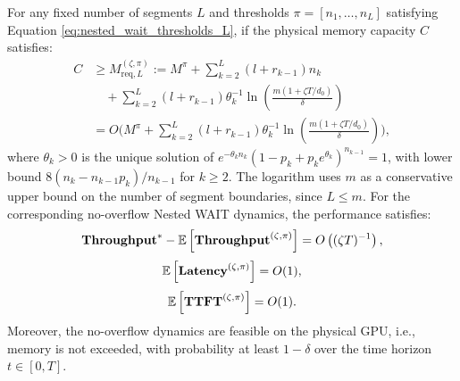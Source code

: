 \begin{theorem}
\label{thm:nested_wait_heavy_traffic, any segment}
For any fixed number of segments $L$ and thresholds $\pi = [n_1, \dots, n_L]$ satisfying Equation \eqref{eq:nested_wait_thresholds_L}, if the physical memory capacity \(C\) satisfies:
\begin{equation}
    \label{eq:nested_wait_memory_L}
    \begin{aligned}
	C &\ge M_{\mathrm{req},L}^{(\zeta,\pi)}
	:= M^\pi
		+ \sum_{k=2}^L (l + r_{k-1}) n_k \\
	&\quad
	+ \sum_{k=2}^L (l + r_{k-1}) \theta_k^{-1}
\ln\left( \frac{m(1+\zeta T/d_0)}{\delta} \right) \\
&= O\biggl( M^\pi
+ \sum_{k=2}^L (l + r_{k-1}) \theta_k^{-1}
\ln\left( \frac{m(1+\zeta T/d_0)}{\delta} \right) \biggr),
    \end{aligned}
\end{equation}
where $\theta_k>0$ is the unique solution of \(e^{-\theta_k n_k}(1-p_k+p_ke^{\theta_k})^{n_{k-1}}=1\), with lower bound $8(n_k-n_{k-1}p_k)/n_{k-1}$ for \(k\ge2\). The logarithm uses \(m\) as a conservative upper bound on the number of segment boundaries, since \(L\le m\).
For the corresponding no-overflow Nested WAIT dynamics, the performance satisfies:
$$\textbf{Throughput}^* - \mathbb{E}\left[ \textbf{Throughput}^{(\zeta, \pi)} \right] = O\left( (\zeta T)^{-1} \right),$$
$$\mathbb{E}\left[ \textbf{Latency}^{(\zeta, \pi)} \right] = O(1),$$
$$\mathbb{E}\left[ \textbf{TTFT}^{(\zeta, \pi)} \right] = O(1).$$
Moreover, the no-overflow dynamics are feasible on the physical GPU, i.e., memory is not exceeded, with probability at least \( 1 - \delta \) over the time horizon \(t \in [0,T]\).
\end{theorem}

